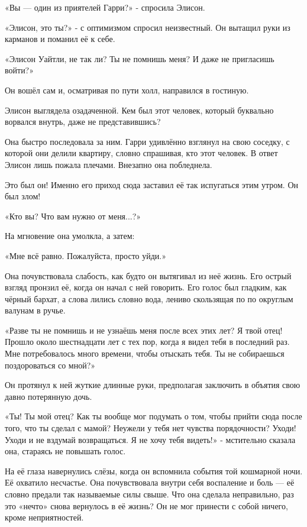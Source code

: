 \documentclass[a4paper,12pt]{book}
\begin{document}
\par
«Вы — один из приятелей Гарри?» - спросила Элисон.
\par
«Элисон, это ты?» - с оптимизмом спросил неизвестный. Он вытащил руки из карманов и поманил её к себе.
\par
«Элисон Уайтли, не так ли? Ты не помнишь меня? И даже не пригласишь войти?»
\par
Он вошёл сам и, осматривая по пути холл, направился в гостиную.
\par
Элисон выглядела озадаченной. Кем был этот человек, который буквально ворвался внутрь, даже не представившись?
\par
Она быстро последовала за ним. Гарри удивлённо взглянул на свою соседку, с которой они делили квартиру, словно спрашивая, кто этот человек. В ответ Элисон лишь пожала плечами. Внезапно она побледнела.
\par
Это был он! Именно его приход сюда заставил её так испугаться этим утром. Он был злом!
\par
«Кто вы? Что вам нужно от меня...?»
\par
На мгновение она умолкла, а затем:
\par
«Мне всё равно. Пожалуйста, просто уйди.»
\par
Она почувствовала слабость, как будто он вытягивал из неё жизнь. Его острый взгляд пронзил её, когда он начал с ней говорить. Его голос был гладким, как чёрный бархат, а слова лились словно вода, лениво скользящая по по округлым валунам в ручье.
\par
«Разве ты не помнишь и не узнаёшь меня после всех этих лет? Я твой отец! Прошло около шестнадцати лет с тех пор, когда я видел тебя в последний раз. Мне потребовалось много времени, чтобы отыскать тебя. Ты не собираешься поздороваться со мной?»
\par
Он протянул к ней жуткие длинные руки, предполагая заключить в объятия свою давно потерянную дочь.
\par
«Ты! Ты мой отец? Как ты вообще мог подумать о том, чтобы прийти сюда после того, что ты сделал с мамой? Неужели у тебя нет чувства порядочности? Уходи! Уходи и не вздумай возвращаться. Я не хочу тебя видеть!» - мстительно сказала она, стараясь не повышать голос.
\par
На её глаза навернулись слёзы, когда он вспомнила события той кошмарной ночи. Её охватило несчастье. Она почувствовала внутри себя воспаление и боль — её словно предали так называемые силы свыше. Что она сделала неправильно, раз это «нечто» снова вернулось в её жизнь? Он не мог принести с собой ничего, кроме неприятностей.
\end{document}
